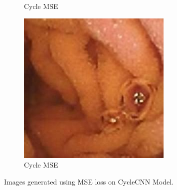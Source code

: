 \begin{figure}[H]
\begin{subfigure}[b]{0.32\textwidth}
    \caption{Cycle MSE}
  \end{subfigure}
  \begin{subfigure}[b]{0.32\textwidth}
    \includegraphics[width=\textwidth]{Chapter7/cycle_mse_456.jpg}
    \caption{Cycle MSE}
  \end{subfigure}
    
    \caption[Images generated using MSE loss on CycleCNN Model.]{Images generated using MSE loss on CycleCNN Model.}
    \label{fig:label7.1}
\end{figure}


